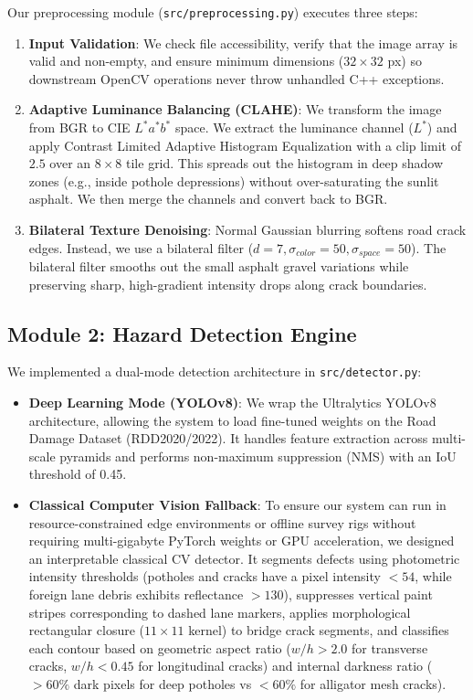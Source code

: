\documentclass[11pt,a4paper]{article}
\begin{document}
Our preprocessing module (\texttt{src/preprocessing.py}) executes three steps:
\begin{enumerate}[noitemsep]
    \item \textbf{Input Validation}: We check file accessibility, verify that the image array is valid and non-empty, and ensure minimum dimensions ($32 \times 32$ px) so downstream OpenCV operations never throw unhandled C++ exceptions.
    \item \textbf{Adaptive Luminance Balancing (CLAHE)}: We transform the image from BGR to CIE $L^*a^*b^*$ space. We extract the luminance channel ($L^*$) and apply Contrast Limited Adaptive Histogram Equalization with a clip limit of $2.5$ over an $8 \times 8$ tile grid. This spreads out the histogram in deep shadow zones (e.g., inside pothole depressions) without over-saturating the sunlit asphalt. We then merge the channels and convert back to BGR.
    \item \textbf{Bilateral Texture Denoising}: Normal Gaussian blurring softens road crack edges. Instead, we use a bilateral filter ($d=7, \sigma_{color}=50, \sigma_{space}=50$). The bilateral filter smooths out the small asphalt gravel variations while preserving sharp, high-gradient intensity drops along crack boundaries.
\end{enumerate}

\subsection{Module 2: Hazard Detection Engine}
We implemented a dual-mode detection architecture in \texttt{src/detector.py}:
\begin{itemize}
    \item \textbf{Deep Learning Mode (YOLOv8)}: We wrap the Ultralytics YOLOv8 architecture, allowing the system to load fine-tuned weights on the Road Damage Dataset (RDD2020/2022). It handles feature extraction across multi-scale pyramids and performs non-maximum suppression (NMS) with an IoU threshold of 0.45.
    \item \textbf{Classical Computer Vision Fallback}: To ensure our system can run in resource-constrained edge environments or offline survey rigs without requiring multi-gigabyte PyTorch weights or GPU acceleration, we designed an interpretable classical CV detector. It segments defects using photometric intensity thresholds (potholes and cracks have a pixel intensity $<54$, while foreign lane debris exhibits reflectance $>130$), suppresses vertical paint stripes corresponding to dashed lane markers, applies morphological rectangular closure ($11 \times 11$ kernel) to bridge crack segments, and classifies each contour based on geometric aspect ratio ($w/h > 2.0$ for transverse cracks, $w/h < 0.45$ for longitudinal cracks) and internal darkness ratio ($>60\%$ dark pixels for deep potholes vs $<60\%$ for alligator mesh cracks).
\end{itemize}
\end{document}

